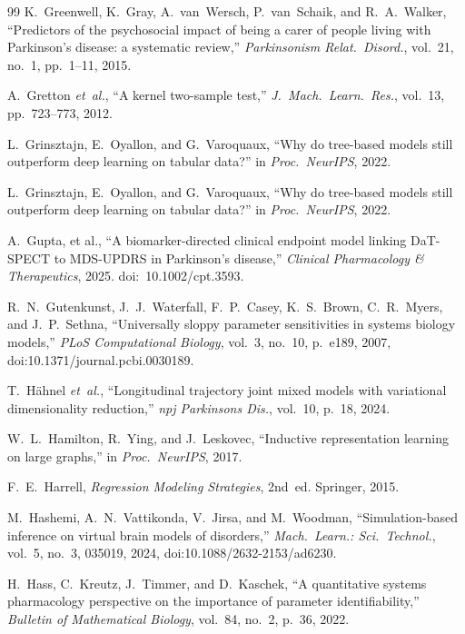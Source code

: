 \begin{thebibliography}{99}
K.~Greenwell, K.~Gray, A.~van~Wersch, P.~van~Schaik, and R.~A.~Walker, ``Predictors of the psychosocial impact of being a carer of people living with Parkinson's disease: a systematic review,'' \textit{Parkinsonism Relat.\ Disord.}, vol.~21, no.~1, pp.~1--11, 2015.

A.~Gretton \textit{et~al.}, ``A kernel two-sample test,'' \textit{J.\ Mach.\ Learn.\ Res.}, vol.~13, pp.~723--773, 2012.

L.~Grinsztajn, E.~Oyallon, and G.~Varoquaux, ``Why do tree-based models still outperform deep learning on tabular data?'' in \textit{Proc.\ NeurIPS}, 2022.

L.~Grinsztajn, E.~Oyallon, and G.~Varoquaux, ``Why do tree-based models still outperform deep learning on tabular data?'' in \textit{Proc.\ NeurIPS}, 2022.

A.~Gupta, et al., ``A biomarker-directed clinical endpoint model linking DaT-SPECT to MDS-UPDRS in Parkinson's disease,'' \textit{Clinical Pharmacology \& Therapeutics}, 2025. doi:~10.1002/cpt.3593.

R.~N.~Gutenkunst, J.~J.~Waterfall, F.~P.~Casey, K.~S.~Brown, C.~R.~Myers, and J.~P.~Sethna, ``Universally sloppy parameter sensitivities in systems biology models,'' \textit{PLoS Computational Biology}, vol.~3, no.~10, p.~e189, 2007, doi:10.1371/journal.pcbi.0030189.


T.~H{\"a}hnel \textit{et~al.}, ``Longitudinal trajectory joint mixed models with variational dimensionality reduction,'' \textit{npj Parkinsons Dis.}, vol.~10, p.~18, 2024.

W.~L.~Hamilton, R.~Ying, and J.~Leskovec, ``Inductive representation learning on large graphs,'' in \textit{Proc.\ NeurIPS}, 2017.

F.~E.~Harrell, \textit{Regression Modeling Strategies}, 2nd~ed. Springer, 2015.

M.~Hashemi, A.~N.~Vattikonda, V.~Jirsa, and M.~Woodman, ``Simulation-based inference on virtual brain models of disorders,'' \textit{Mach.\ Learn.: Sci.\ Technol.}, vol.~5, no.~3, 035019, 2024, doi:10.1088/2632-2153/ad6230.

H.~Hass, C.~Kreutz, J.~Timmer, and D.~Kaschek, ``A quantitative systems pharmacology perspective on the importance of parameter identifiability,'' \textit{Bulletin of Mathematical Biology}, vol.~84, no.~2, p.~36, 2022.


\end{thebibliography}
